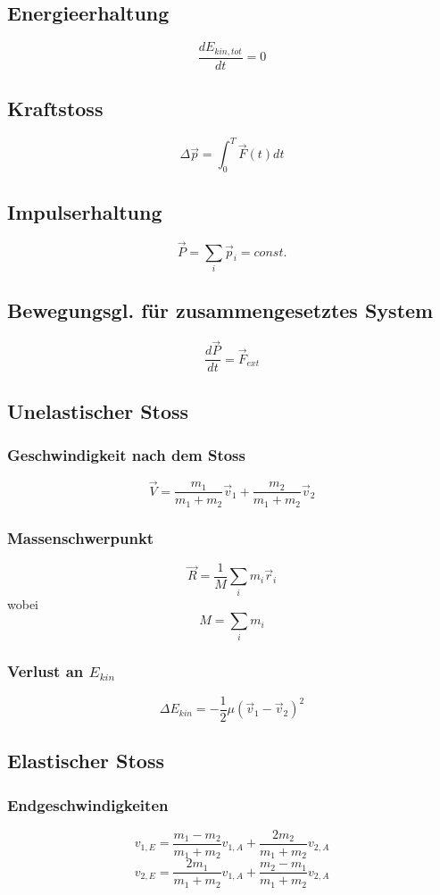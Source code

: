 \documentclass{article}
\begin{document}
\begin{multicols*}{3}
  \subsection{Energieerhaltung}
  $$\frac{dE_{kin, tot}}{dt} = 0 $$

  \subsection{Kraftstoss}

  $$\Delta \vec{p} = \int_{0}^{T} \vec{F}(t)dt$$

  \subsection{Impulserhaltung}
  $$\vec{P}=\sum_{i} \vec{p}_i = const.$$

  \subsection{Bewegungsgl. für zusammengesetztes System}
  $$\frac{d\vec{P}}{dt}= \vec{F}_{ext}$$

  \subsection{Unelastischer Stoss}
  \subsubsection{Geschwindigkeit nach dem Stoss}
  $$\vec{V}= \frac{m_1}{m_1+m_2}\vec{v}_1+\frac{m_2}{m_1+m_2}\vec{v}_2$$

  \subsubsection{Massenschwerpunkt}
  $$\vec{R}=\frac{1}{M}\sum_{i} m_i \vec{r}_i$$
  wobei
  $$M = \sum_{i} m_i$$

  \subsubsection{Verlust an $E_{kin}$}
  $$\Delta E_{kin} = -\frac{1}{2} \mu (\vec{v}_1 - \vec{v}_2)^2$$

  \subsection{Elastischer Stoss}

  \subsubsection{Endgeschwindigkeiten}
  $$v_{1,E} = \frac{m_1-m_2}{m_1+m_2}v_{1,A} + \frac{2m_2}{m_1+m_2}v_{2,A}$$
  $$v_{2,E} = \frac{2m_1}{m_1+m_2}v_{1,A} + \frac{m_2-m_1}{m_1+m_2}v_{2,A}$$

\end{multicols*}
\end{document}
